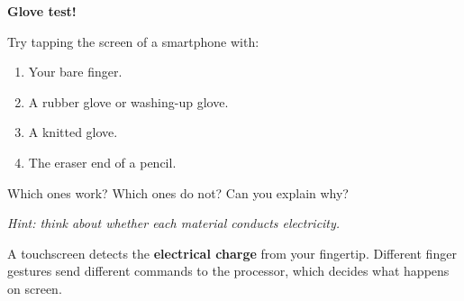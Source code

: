 \begin{experiment}
  \textbf{Glove test!}

  Try tapping the screen of a smartphone with:
  \begin{enumerate}[label=\textbf{\arabic*.}]
    \item Your bare finger.
    \item A rubber glove or washing-up glove.
    \item A knitted glove.
    \item The eraser end of a pencil.
  \end{enumerate}
  Which ones work? Which ones do not? Can you explain why?

  \emph{Hint: think about whether each material conducts electricity.}
\end{experiment}

\sectionrule

\begin{bigidea}
  A touchscreen detects the \textbf{electrical charge} from your fingertip.
  Different finger gestures send different commands to the processor,
  which decides what happens on screen.
\end{bigidea}

